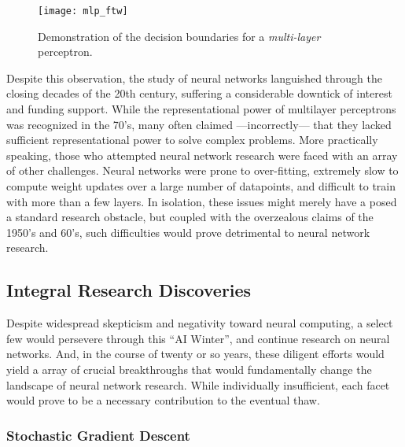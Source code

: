 \begin{figure}
\begin{centering}
\texttt{[image: mlp\_ftw]}
\caption{Demonstration of the decision boundaries for a \emph{multi-layer} perceptron.}
\label{fig:mlp_ftw}
\end{centering}
\end{figure}

Despite this observation, the study of neural networks languished through the closing decades of the 20th century, suffering a considerable downtick of interest and funding support.
While the representational power of multilayer perceptrons was recognized in the 70's, many often claimed ---incorrectly--- that they lacked sufficient representational power to solve complex problems.
More practically speaking, those who attempted neural network research were faced with an array of other challenges.
Neural networks were prone to over-fitting, extremely slow to compute weight updates over a large number of datapoints, and difficult to train with more than a few layers.
In isolation, these issues might merely have a posed a standard research obstacle, but coupled with the overzealous claims of the 1950's and 60's,  such difficulties would prove detrimental to neural network research.


\subsection{Integral Research Discoveries}
\label{sec:advances}

Despite widespread skepticism and negativity toward neural computing, a select few would persevere through this ``AI Winter'', and continue research on neural networks.
And, in the course of twenty or so years, these diligent efforts would yield a array of crucial breakthroughs that would fundamentally change the landscape of neural network research.
While individually insufficient, each facet would prove to be a necessary contribution to the eventual thaw.

\subsubsection{Stochastic Gradient Descent}
\label{subsec:sgd}

